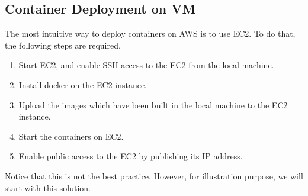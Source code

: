 \subsection{Container Deployment on VM}

The most intuitive way to deploy containers on AWS is to use EC2. To do that, the following steps are required.

\begin{enumerate}
	\item Start EC2, and enable SSH access to the EC2 from the local machine.
	\item Install docker on the EC2 instance.
	\item Upload the images which have been built in the local machine to the EC2 instance.
	\item Start the containers on EC2.
	\item Enable public access to the EC2 by publishing its IP address.
\end{enumerate}

Notice that this is not the best practice. However, for illustration purpose, we will start with this solution.



















